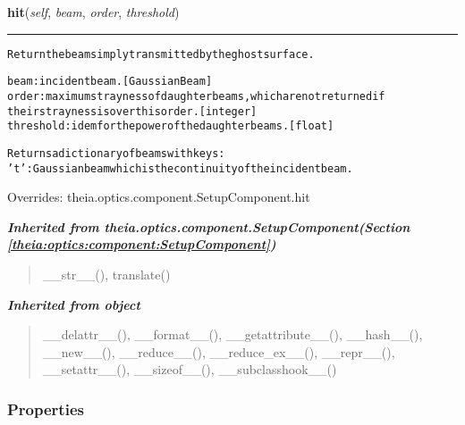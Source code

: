 \hspace{.8\funcindent}\begin{boxedminipage}{\funcwidth}

    \raggedright \textbf{hit}(\textit{self}, \textit{beam}, \textit{order}, \textit{threshold})

    \vspace{-1.5ex}

    \rule{\textwidth}{0.5\fboxrule}
\setlength{\parskip}{2ex}
\begin{alltt}
Return the beam simply transmitted by the ghost surface.

beam: incident beam. [GaussianBeam]
order: maximum strayness of daughter beams, which are not returned if
    their strayness is over this order. [integer]
threshold: idem for the power of the daughter beams. [float]

Returns a dictionary of beams with keys:
    't': Gaussian beam which is the continuity of the incident beam.
\end{alltt}

\setlength{\parskip}{1ex}
      Overrides: theia.optics.component.SetupComponent.hit

    \end{boxedminipage}


\large{\textbf{\textit{Inherited from theia.optics.component.SetupComponent\textit{(Section \ref{theia:optics:component:SetupComponent})}}}}

\begin{quote}
\_\_str\_\_(), translate()
\end{quote}

\large{\textbf{\textit{Inherited from object}}}

\begin{quote}
\_\_delattr\_\_(), \_\_format\_\_(), \_\_getattribute\_\_(), \_\_hash\_\_(), \_\_new\_\_(), \_\_reduce\_\_(), \_\_reduce\_ex\_\_(), \_\_repr\_\_(), \_\_setattr\_\_(), \_\_sizeof\_\_(), \_\_subclasshook\_\_()
\end{quote}


  \subsubsection{Properties}

